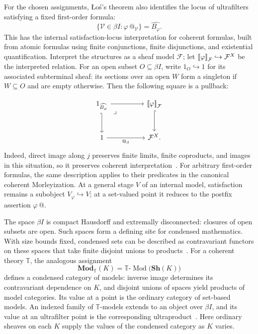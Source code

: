 \documentclass[11pt]{article}
\makeatletter
\newcommand{\llbracket}{\mathopen{[\mkern-3mu[}}
\newcommand{\rrbracket}{\mathclose{]\mkern-3mu]}}
\newcommand{\atsign}{\mathord{@}}
\theoremstyle{definition}
\makeatother
\begin{document}
For the chosen assignments, \L{}o\'s's theorem also identifies the locus
of ultrafilters satisfying a fixed first-order formula:
\[
\{\mathcal V\in\beta I:\varphi\,\atsign_{\mathcal V}\}
=\widehat{B_\varphi}.
\]
This has the internal satisfaction-locus interpretation for coherent
formulas, built from atomic formulas using finite conjunctions, finite
disjunctions, and existential quantification. Interpret the structures
as a sheaf model \(\mathcal F\); let
\(\llbracket\varphi\rrbracket_{\mathcal F}\hookrightarrow\mathcal F^X\)
be the interpreted relation. For an open subset \(O\subseteq\beta I\),
write \(1_O\hookrightarrow1\) for its associated subterminal sheaf:
its sections over an open \(W\) form a singleton if \(W\subseteq O\)
and are empty otherwise.
Then the following square is a pullback:

\[
\begin{tikzcd}[row sep=large,column sep=huge]
1_{\widehat{B_\varphi}} \arrow[r] \arrow[d,hook']
  \arrow[dr,phantom,"\lrcorner",very near start] &
\llbracket\varphi\rrbracket_{\mathcal F} \arrow[d,hook] \\
1 \arrow[r,"\atsign_\beta"'] & \mathcal F^X.
\end{tikzcd}
\]
Indeed, direct image along \(j\) preserves finite limits, finite
coproducts, and images in this situation, so it preserves coherent
interpretation~\cite[Corollary~1.10]{HaineCondensedPoints}.
For arbitrary first-order formulas, the same description applies to
their predicates in the canonical coherent Morleyization.
At a general stage \(V\) of an internal model, satisfaction remains a
subobject \(V_\varphi\hookrightarrow V\); at a set-valued point it
reduces to the postfix assertion \(\varphi\,\atsign\).

The space \(\beta I\) is compact Hausdorff and extremally disconnected:
closures of open subsets are open.
Such spaces form a defining site for condensed mathematics. With size
bounds fixed, condensed sets can be described as contravariant functors
on these spaces that take finite disjoint unions to
products~\cite[Example~2.5 and Proposition~2.8]{ScholzeCondensed}.
For a coherent theory \(\mathbb T\), the analogous assignment
\[
\mathbf{Mod}_{\mathbb T}(K)
=\mathbb T\text{-}\operatorname{Mod}\bigl(\mathbf{Sh}(K)\bigr)
\]
defines a condensed category of models: inverse image determines its
contravariant dependence on \(K\), and disjoint unions of spaces yield
products of model categories. Its value at a point is the ordinary
category of set-based models. An indexed family of \(\mathbb T\)-models
extends to an object
over \(\beta I\), and its value at an ultrafilter point is the
corresponding ultraproduct~\cite[Example~0.2 and Proposition~1.6]{HaineCondensedPoints}.
Here ordinary sheaves on each \(K\) supply the values of the condensed
category as \(K\) varies.
\end{document}
